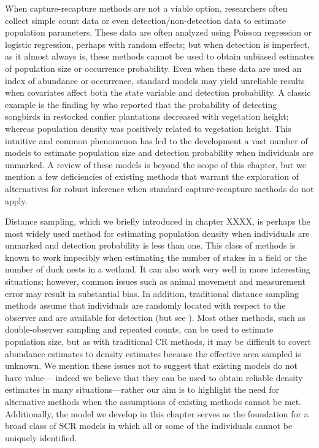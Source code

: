 When capture-recapture methods are not a viable option, researchers
often collect simple count data or even detection/non-detection data
to estimate population parameters. These data are often analyzed using
Poisson regression or logistic regression, perhaps with random
effects; but when detection is imperfect, as it almost always is,
these methods cannot be used to obtain unbiased estimates of
population size or occurrence probability. Even when these data are
used an index of abundance or occurrence, standard models may yield
unreliable results when covariates affect both the state variable and
detection probability. A classic example is the finding by
\citet{bibby_buckland:1987} who reported that the probability of detecting
songbirds in restocked confier plantations decreased with vegetation
height; whereas population density was positively related to
vegetation height. This intuitive and common phenomenon has led to the
development a vast number of models to estimate population size and
detection probability when individuals are unmarked. A review of these
models is beyond the scope of this 
chapter, but we mention a few deficiencies of existing methods
that warrant the exploration of alternatives for robust inference when
standard capture-recapture methods do not apply.

Distance sampling, which we briefly introduced in chapter XXXX,
is perhaps the most widely used method for
estimating population density when individuals are unmarked and
detection probability is less than one. This class of methods is known
to work impecibly when estimating the number of stakes in a field or
the number of duck nests in a wetland. It can also work very well in
more interesting situations; however, %
common issues such as animal movement and measurement error may result in
substantial bias. In addition, traditional distance sampling methods
assume that individuals are randomly located with respect to the
observer and are available for detection (but see
\citet{johnson_etal:2010,chandler_etal:2011}). %
Most other
methods, such as double-observer sampling and repeated counts, can be
used to estimate population size, but as with traditional CR methods,
it may be difficult to covert abundance estimates to
density estimates because the effective area sampled is unknown. We
mention these issues not to suggest that existing models do not have
value---
indeed we believe that they can be used to obtain reliable density
estimates in many situations---rather our aim is to highlight the need for
alternative methods when the assumptions of existing methods cannot be
met. Additionally, the model we develop in this chapter serves as the
foundation for a broad class of SCR models in which all or some of the
individuals cannot be uniquely identified.



